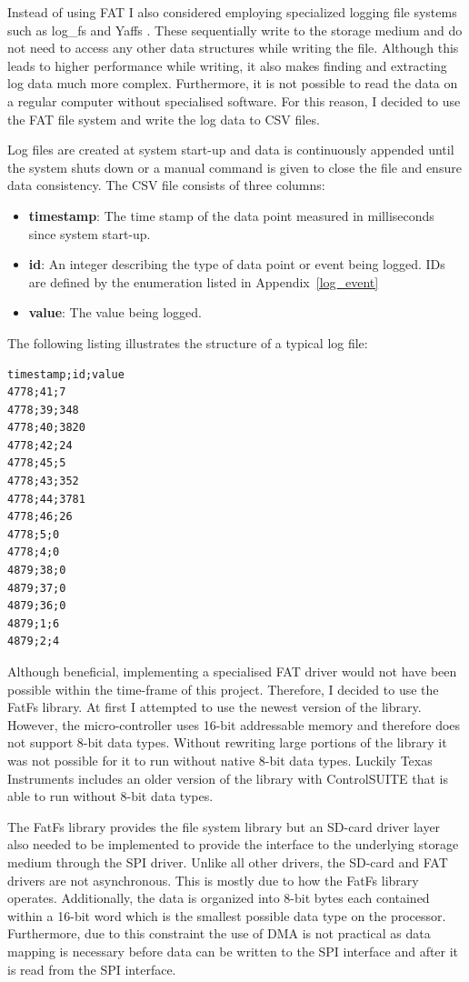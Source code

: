 Instead of using FAT I also considered employing specialized logging file systems such as log\_fs  and Yaffs . These sequentially write to the storage medium and do not need to access any other data structures while writing the file. Although this leads to higher performance while writing, it also makes finding and extracting log data much more complex. Furthermore, it is not possible to read the data on a regular computer without specialised software. For this reason, I decided to use the FAT file system and write the log data to CSV files.

Log files are created at system start-up and data is continuously appended until the system shuts down or a manual command is given to close the file and ensure data consistency. The CSV file consists of three columns:

\begin{itemize}
    \item \textbf{timestamp}: The time stamp of the data point measured in milliseconds since system start-up.
    \item \textbf{id}: An integer describing the type of data point or event being logged. IDs are defined by the enumeration listed in Appendix~\ref{log_event}
    \item \textbf{value}: The value being logged.
\end{itemize}

The following listing illustrates the structure of a typical log file:

\begin{verbatim}
timestamp;id;value
4778;41;7
4778;39;348
4778;40;3820
4778;42;24
4778;45;5
4778;43;352
4778;44;3781
4778;46;26
4778;5;0
4778;4;0
4879;38;0
4879;37;0
4879;36;0
4879;1;6
4879;2;4
\end{verbatim}

Although beneficial, implementing a specialised FAT driver would not have been possible within the time-frame of this project. Therefore, I decided to use the FatFs library. At first I attempted to use the newest version of the library. However, the micro-controller uses 16-bit addressable memory and therefore does not support 8-bit data types. Without rewriting large portions of the library it was not possible for it to run without native 8-bit data types. Luckily Texas Instruments includes an older version of the library with ControlSUITE that is able to run without 8-bit data types.

The FatFs library provides the file system library but an SD-card driver layer also needed to be implemented to provide the interface to the underlying storage medium through the SPI driver. Unlike all other drivers, the SD-card and FAT drivers are not asynchronous. This is mostly due to how the FatFs library operates. Additionally, the data is organized into 8-bit bytes each contained within a 16-bit word which is the smallest possible data type on the processor. Furthermore, due to this constraint the use of DMA is not practical as data mapping is necessary before data can be written to the SPI interface and after it is read from the SPI interface.

